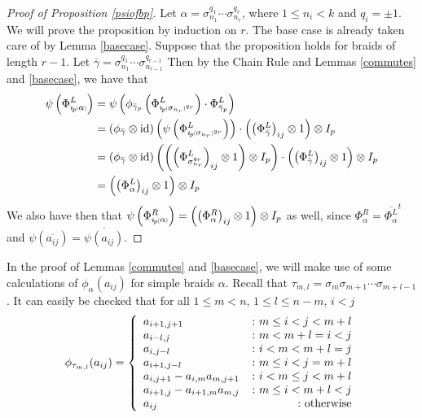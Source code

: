 \documentclass[11pt]{amsart}
\def\s{{\sigma}}
\newcommand*{\subsmallp}[1]{\scalebox{.5}{\ensuremath#1}}
\newcommand{\subpp}[2][p]{\imath_{\hspace*{-1pt}#1}\hspace*{-.5pt}\subsmallp(#2\subsmallp)}
\newcommand\id{\operatorname{id}}
\theoremstyle{definition}
\begin{document}
\begin{proof} [Proof of Proposition \ref{psiofbp}]
Let $\alpha = \s_{n_1}^{q_1}\cdots\s_{n_r}^{q_r}$, where $1\le n_i<k$ and $q_i = \pm 1$.  We will prove the proposition by induction on $r$.  The base case is already taken care of by Lemma \ref{basecase}.  Suppose that the proposition holds for braids of length $r-1$.  Let $\bar\gamma =\s_{n_1}^{q_1}\cdots\s_{n_{r-1}}^{q_{r-1}}$ Then by the Chain Rule and Lemmas \ref{commutes} and \ref{basecase}, we have that
\begin{align*}
\psi\left(\Phi_{\subpp\alpha}^L\right) &= \psi\left(\phi_{\bar\gamma_p}\left(\Phi_{\subpp{\s_{n_r}}^{q_r}}^L\right)\cdot\Phi_{\bar\gamma_p}^L\right)\\
&= \left(\phi_{\bar\gamma}\otimes\id\right)\left(\psi\left(\Phi_{\subpp{\s_{n_r}}^{q_r}}^L\right)\right)\cdot \left(\left(\Phi_{\bar\gamma}^L\right)_{ij}\otimes 1\right)\otimes I_p\\
&= \left(\phi_{\bar\gamma}\otimes\id\right)\left(\left(\left(\Phi_{\s_{n_r}^{q_r}}^L\right)_{ij}\otimes 1\right)\otimes I_p\right)\cdot \left(\left(\Phi_{\bar\gamma}^L\right)_{ij}\otimes 1\right)\otimes I_p\\
&= \left(\left(\Phi_{\alpha}^L\right)_{ij}\otimes 1\right)\otimes I_p
\end{align*}
We also have then that $\psi\left(\Phi_{\subpp\alpha}^R\right) = \left(\left(\Phi_{\alpha}^R\right)_{ij}\otimes 1\right)\otimes I_p$ as well, since $\Phi_\alpha^R = \overline{\Phi_\alpha^L}^t$ and $\psi(\overline{a_{ij}}) = \overline{\psi(a_{ij})}$.
\end{proof}


In the proof of Lemmas \ref{commutes} and \ref{basecase}, we will make use of some calculations of $\phi_\alpha(a_{ij})$ for simple braids $\alpha$.  Recall that $\tau_{m,l} = \s_m\s_{m+1}\cdots\s_{m+l-1}$.  It can easily be checked that for all $1\le m < n$, $1\le l \le n - m$, $i<j$
\begin{equation}\label{tau}
\phi_{\tau_{m,l}}(a_{ij}) =
\left\{
     \begin{array}{lr}
       a_{i+1,j+1} & \colon m\le i<j< m+l\\
       a_{i-l,j} & \colon m<m+l=i<j\\
       a_{i,j-l} & \colon i<m<m+l=j\\
       a_{i+1,j-l} & \colon m\le i < j = m+l\\
       a_{i,j+1}-a_{i,m}a_{m,j+1} & \colon i<m\le j< m+l\\
       a_{i+1,j}-a_{i+1,m}a_{m,j} & \colon m\le i< m+l<j\\
       a_{ij} & \colon \textnormal{otherwise}
     \end{array}
\right.
\end{equation}
\end{document}
